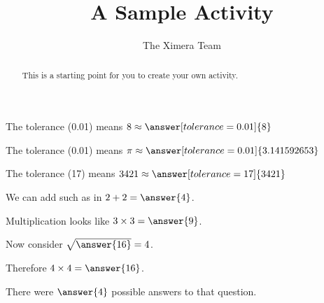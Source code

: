 \documentclass{ximera}
\title{A Sample Activity}
\author{The Ximera Team}
\begin{document}
\begin{abstract}
This is a starting point for you to create your own activity.
\end{abstract}

\maketitle

\begin{problem}
   The tolerance (0.01) means $8 \approx \answer[tolerance=0.01]{8}$
\end{problem}

 \begin{problem}
   The tolerance (0.01) means $\pi \approx \answer[tolerance=0.01]{3.141592653}$
 \end{problem}

 \begin{problem}
   The tolerance (17) means $3421 \approx \answer[tolerance=17]{3421}$
 \end{problem}


 \begin{problem}
   We can add such as in $2 + 2 = \answer{4}$.
   \begin{problem}
     Multiplication looks like $3 \times 3 = \answer{9}$.
     \begin{problem}
       Now consider $\sqrt{\answer{16}} = 4$.
       \begin{problem}
         Therefore $4 \times 4 = \answer{16}$.
       \end{problem}
     \end{problem}
   \end{problem}
   \end{problem}

\begin{problem}
  \begin{multipleChoice}
   \end{multipleChoice}

   \begin{problem}
     There were $\answer{4}$ possible answers to that question.

     \begin{problem}
       \begin{multipleChoice}
       \end{multipleChoice}
     \end{problem}
   \end{problem}
\end{problem}
\end{document}
